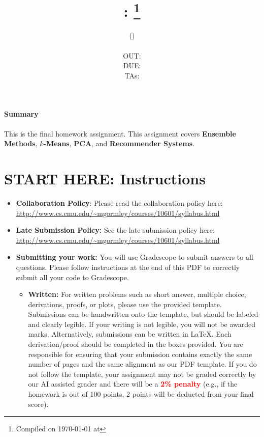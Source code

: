\documentclass[11pt,addpoints,answers]{exam}
\date{}
\title{\textsc{\hwNum}: \textsc{\hwTopic} 
\thanks{Compiled on \today{} at \currenttime{}} \\
\vspace{1em}
} %
\author{\textsc{\large \courseNum{} \courseName{} (\courseSem)}\\
\courseUrl
\vspace{1em}\\
  OUT: \outDate \\
  DUE: \dueDate \\
  TAs: \taNames\\
}
\date{}
\newcommand{\homeworktype}{\string written}
\newcommand{\summary}{
    \begin{notebox}
        \paragraph{Summary} This is the final homework assignment. This assignment covers \textbf{Ensemble Methods}, \textbf{$k$-Means}, \textbf{PCA}, and \textbf{Recommender Systems}.
    \end{notebox}
}
\begin{document}
    \maketitle
    \summary{}
    
\section*{START HERE: Instructions}
\begin{itemize}
\newcommand \maxsubs {10 }

\item \textbf{Collaboration Policy}: Please read the collaboration policy here: \url{http://www.cs.cmu.edu/~mgormley/courses/10601/syllabus.html}

\item\textbf{Late Submission Policy:} See the late submission policy here: \url{http://www.cs.cmu.edu/~mgormley/courses/10601/syllabus.html}

\item\textbf{Submitting your work:} You will use Gradescope to submit
  answers to all questions\ifthenelse{\equal{\homeworktype}{\string written}}{}{ and code}. Please
  follow instructions at the end of this PDF to correctly submit all your code to Gradescope.

\begin{itemize}
    
    \item \textbf{Written:} For written problems such as short answer, multiple choice, derivations, proofs, or plots, please use the provided template. Submissions can be handwritten onto the template, but should be labeled and clearly legible. If your writing is not legible, you will not be awarded marks. Alternatively, submissions can be written in \LaTeX{}. Each derivation/proof should be completed in the boxes provided. You are responsible for ensuring that your submission contains exactly the same number of pages and the same alignment as our PDF template. If you do not follow the template, your assignment may not be graded correctly by our AI assisted grader and there will be a \textbf{\textcolor{red}{2\% penalty}} (e.g., if the homework is out of 100 points, 2 points will be deducted from your final score).


\end{itemize}
\end{itemize}
\end{document}
